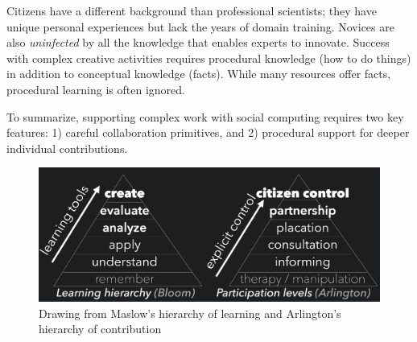 Citizens have a different background than professional scientists; they have unique
 personal experiences but lack the years of domain training. Novices are also
\textit{uninfected} by all the knowledge that enables experts to
innovate. Success with complex creative activities requires procedural
knowledge (how to do things) in addition to conceptual
knowledge (facts). While many resources offer facts, procedural
learning is often ignored. 




To summarize, supporting complex work with social computing requires two key features: 
1) careful collaboration primitives, and 2) procedural support for deeper individual contributions.


\begin{figure}[!h] 
  \centering
 \includegraphics[width=1.0\textwidth]{figures/intro/intro-taxonomy}
  \caption[Drawing from Maslow's hierarchy of learning and  hierarchy of contribution]
{Drawing from Maslow's hierarchy of learning and Arlington's hierarchy of contribution}
  \label{fig:intro-taxonomy}
\end{figure}

